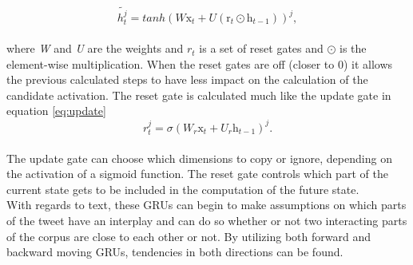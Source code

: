 \begin{equation} \label{eq:candidate}
\tilde{h_{t}^{j}} = tanh\left(W\mathrm{x}_{t}+U\left(\mathrm{r}_{t}\odot\mathrm{h}_{t-1}\right)\right)^{j},
\end{equation}\\

where \textit{W} and \textit{U} are the weights and $r_{t}$ is a set of reset gates and $\odot$ is the element-wise multiplication. When the reset gates are off (closer to 0) it allows the previous calculated steps to have less impact on the calculation of the candidate activation. The reset gate is calculated much like the update gate in equation \ref{eq:update}\\

\begin{equation}\label{eq:reset}
r_{t}^{j}=\sigma\left(W_{r}\mathrm{x}_{t}+U_{r}\mathrm{h}_{t-1}\right)^{j}.
\end{equation}\\

The update gate can choose which dimensions to copy or ignore, depending on the activation of a sigmoid function. The reset gate controls which part of the current state gets to be included in the computation of the future state.\\
With regards to text, these GRUs can begin to make assumptions on which parts of the tweet have an interplay and can do so whether or not two interacting parts of the corpus are close to each other or not. By utilizing both forward and backward moving GRUs, tendencies in both directions can be found.

